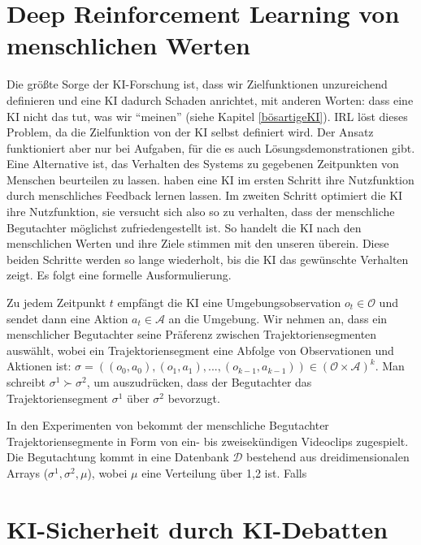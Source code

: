 \section{Deep Reinforcement Learning von menschlichen Werten}
Die größte Sorge der KI-Forschung ist, dass wir Zielfunktionen unzureichend definieren und eine KI dadurch Schaden anrichtet, mit anderen Worten: dass eine KI nicht das tut, was wir \enquote{meinen} (siehe Kapitel \ref{bösartigeKI}). IRL löst dieses Problem, da die Zielfunktion von der KI selbst definiert wird. Der Ansatz funktioniert aber nur bei Aufgaben, für die es auch Lösungsdemonstrationen gibt. Eine Alternative ist, das Verhalten des Systems zu gegebenen Zeitpunkten von Menschen beurteilen zu lassen. \citeauthor{christiano_deep_2017} haben eine KI im ersten Schritt ihre Nutzfunktion durch menschliches Feedback lernen lassen. Im zweiten Schritt optimiert die KI ihre Nutzfunktion, sie versucht sich also so zu verhalten, dass der menschliche Begutachter möglichst zufriedengestellt ist. So handelt die KI nach den menschlichen Werten und ihre Ziele stimmen mit den unseren überein. Diese beiden Schritte werden so lange wiederholt, bis die KI das gewünschte Verhalten zeigt.  Es folgt eine formelle Ausformulierung.

Zu jedem Zeitpunkt $t$ empfängt die KI eine Umgebungsobservation $o_t \in \mathcal{O}$ und sendet dann eine Aktion $a_t \in \mathcal{A}$ an die Umgebung. Wir nehmen an, dass ein menschlicher Begutachter seine Präferenz zwischen Trajektoriensegmenten auswählt, wobei ein Trajektoriensegment eine Abfolge von Observationen und Aktionen ist: $\sigma = ((o_0,a_0),(o_1,a_1),...,(o_{k-1},a_{k-1})) \in (\mathcal{O} \times \mathcal{A})^k$. Man schreibt $\sigma^1 \succ \sigma^2$, um auszudrücken, dass der Begutachter das Trajektoriensegment $\sigma^1$ über $\sigma^2$ bevorzugt.

In den Experimenten von \citeauthor{christiano_deep_2017} bekommt der menschliche Begutachter Trajektoriensegmente in Form von ein- bis zweisekündigen Videoclips zugespielt. Die Begutachtung kommt in eine Datenbank $\mathcal{D}$ bestehend aus dreidimensionalen Arrays ($\sigma^1,\sigma^2,\mu$), wobei $\mu$ eine Verteilung über {1,2} ist. Falls 

\section{KI-Sicherheit durch KI-Debatten}

